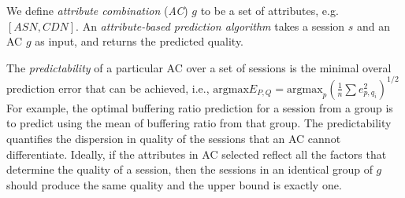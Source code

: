 We define {\it attribute combination} ({\it AC}) $g$ to be a set of attributes, e.g. $[ASN, CDN]$. An {\it attribute-based prediction algorithm} takes a session $s$ and an AC $g$ as input, and returns the predicted quality. 


The {\it predictability} of a particular AC over a set of sessions is the minimal overal prediction error that can be achieved, i.e., $\textrm{argmax}E_{P,Q}=\textrm{argmax}_p\left(\frac{1}{n}\sum e_{p,q_i}^2\right)^{1/2}$
For example, the optimal buffering ratio prediction for a session from a group is to predict using the mean of buffering ratio from that group. The predictability quantifies the dispersion in quality of the sessions that an AC cannot differentiate. Ideally, if the attributes in AC selected reflect all the factors that determine the quality of a session, then the sessions in an identical group of $g$ should produce the same quality and the upper bound is exactly one. 




